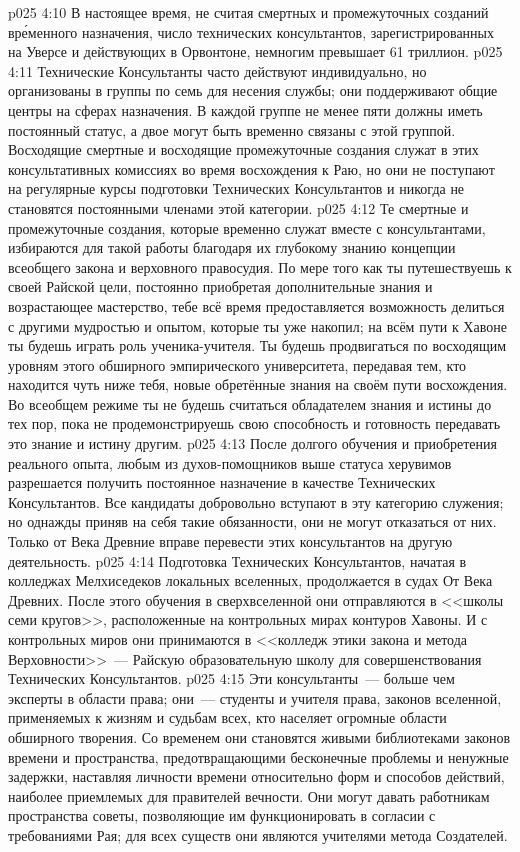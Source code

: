 \vs p025 4:10 \pc В настоящее время, не считая смертных и промежуточных созданий вр\'еменного назначения, число технических консультантов, зарегистрированных на Уверсе и действующих в Орвонтоне, немногим превышает 61 триллион.
\vs p025 4:11 Технические Консультанты часто действуют индивидуально, но организованы в группы по семь для несения службы; они поддерживают общие центры на сферах назначения. В каждой группе не менее пяти должны иметь постоянный статус, а двое могут быть временно связаны с этой группой. Восходящие смертные и восходящие промежуточные создания служат в этих консультативных комиссиях во время восхождения к Раю, но они не поступают на регулярные курсы подготовки Технических Консультантов и никогда не становятся постоянными членами этой категории.
\vs p025 4:12 Те смертные и промежуточные создания, которые временно служат вместе с консультантами, избираются для такой работы благодаря их глубокому знанию концепции всеобщего закона и верховного правосудия. По мере того как ты путешествуешь к своей Райской цели, постоянно приобретая дополнительные знания и возрастающее мастерство, тебе всё время предоставляется возможность делиться с другими мудростью и опытом, которые ты уже накопил; на всём пути к Хавоне ты будешь играть роль ученика\hyp{}учителя. Ты будешь продвигаться по восходящим уровням этого обширного эмпирического университета, передавая тем, кто находится чуть ниже тебя, новые обретённые знания на своём пути восхождения. Во всеобщем режиме ты не будешь считаться обладателем знания и истины до тех пор, пока не продемонстрируешь свою способность и готовность передавать это знание и истину другим.
\vs p025 4:13 После долгого обучения и приобретения реального опыта, любым из духов\hyp{}помощников выше статуса херувимов разрешается получить постоянное назначение в качестве Технических Консультантов. Все кандидаты добровольно вступают в эту категорию служения; но однажды приняв на себя такие обязанности, они не могут отказаться от них. Только от Века Древние вправе перевести этих консультантов на другую деятельность.
\vs p025 4:14 \pc Подготовка Технических Консультантов, начатая в колледжах Мелхиседеков локальных вселенных, продолжается в судах От Века Древних. После этого обучения в сверхвселенной они отправляются в <<школы семи кругов>>, расположенные на контрольных мирах контуров Хавоны. И с контрольных миров они принимаются в <<колледж этики закона и метода Верховности>>~--- Райскую образовательную школу для совершенствования Технических Консультантов.
\vs p025 4:15 Эти консультанты~--- больше чем эксперты в области права; они~--- студенты и учителя  права, законов вселенной, применяемых к жизням и судьбам всех, кто населяет огромные области обширного творения. Со временем они становятся живыми библиотеками законов времени и пространства, предотвращающими бесконечные проблемы и ненужные задержки, наставляя личности времени относительно форм и способов действий, наиболее приемлемых для правителей вечности. Они могут давать работникам пространства советы, позволяющие им функционировать в согласии с требованиями Рая; для всех существ они являются учителями метода Создателей.
